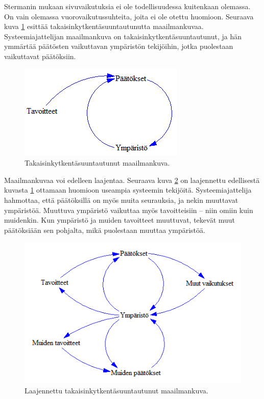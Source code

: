 \documentclass[finnish,12pt,a4paper,pdftex]{article}
\begin{document}
\begin{onehalfspacing}
Stermanin \cite[s. 11]{Sterman2000} mukaan sivuvaikutuksia ei ole todellisuudessa kuitenkaan olemassa. On vain olemassa vuorovaikutussuhteita, joita ei ole otettu huomioon. Seuraava kuva \ref{sysdyn:takaisinkytkentasuuntautunut} esittää takaisinkytkentäsuuntautunutta maailmankuvaa. Systeemiajattelijan maailmankuva on takaisinkytkentäsuuntautunut, ja hän ymmärtää päätösten vaikuttavan ympäristön tekijöihin, jotka puolestaan vaikuttavat päätöksiin. 

\begin{figure}[H]
\centering \includegraphics{takaisinkytkentasuuntautunut}
\caption{Takaisinkytkentäsuuntautunut maailmankuva. \cite[s. 11]{Sterman2000} \label{sysdyn:takaisinkytkentasuuntautunut}}
\end{figure}

Maailmankuvaa voi edelleen laajentaa. Seuraava kuva \ref{sysdyn:laajennettutakaisinkytkentasuuntautunut} on laajennettu edellisestä kuvasta \ref{sysdyn:takaisinkytkentasuuntautunut} ottamaan huomioon useampia systeemin tekijöitä. Systeemiajattelija hahmottaa, että päätöksillä on myös muita seurauksia, ja nekin muuttavat ympäristöä. Muuttuva ympäristö vaikuttaa myös tavoitteisiin -- niin omiin kuin muidenkin. Kun ympäristö ja muiden tavoitteet muuttuvat, tekevät muut päätöksiään sen pohjalta, mikä puolestaan muuttaa ympäristöä. \cite[s. 11--12]{Sterman2000}

\begin{figure}[H]
\centering \includegraphics{laajennettutakaisinkytkentasuuntautunut}
\caption{Laajennettu takaisinkytkentäsuuntautunut maailmankuva. \cite[s. 11]{Sterman2000} \label{sysdyn:laajennettutakaisinkytkentasuuntautunut}}
\end{figure}



\end{onehalfspacing}
\end{document}

